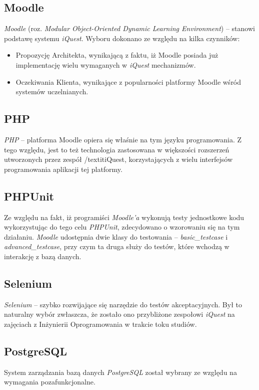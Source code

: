 \subsection{Moodle}
\emph{Moodle} (roz. \textit{Modular Object-Oriented Dynamic Learning Environment}) -- stanowi podstawę systemu \textit{iQuest}. Wyboru dokonano ze względu na kilka czynników:
\begin{itemize}
\item{Propozycję Architekta, wynikającą z faktu, iż Moodle posiada już implementację wielu wymaganych w \textit{iQuest} mechanizmów.}
\item{Oczekiwania Klienta, wynikające z popularności platformy Moodle wśród systemów uczelnianych.}
\end{itemize}

\subsection{PHP}
\emph{PHP} -- platforma Moodle opiera się właśnie na tym języku programowania. Z tego względu, jest to też technologia zastosowana w większości rozszerzeń utworzonych przez zespół /textit{iQuest}, korzystających z wielu interfejsów programowania aplikacji tej platformy.

\subsection{PHPUnit}
Ze względu na fakt, iż programiści \textit{Moodle'a} wykonują testy jednostkowe kodu wykorzystując do tego celu \emph{PHPUnit}, zdecydowano o wzorowaniu się na tym działaniu. \textit{Moodle} udostępnia dwie klasy do testowania -- \textit{basic\_testcase} i \textit{advanced\_testcase}, przy czym ta druga służy do testów, które wchodzą w interakcję z bazą danych.

\subsection{Selenium}
\emph{Selenium} -- szybko rozwijające się narzędzie do testów akceptacyjnych. Był to naturalny wybór zwłaszcza, że zostało ono przybliżone zespołowi \textit{iQuest} na zajęciach z Inżynierii Oprogramowania w trakcie toku studiów.

\subsection{PostgreSQL}
System zarządzania bazą danych \emph{PostgreSQL} został wybrany ze względu na wymagania pozafunkcjonalne.

